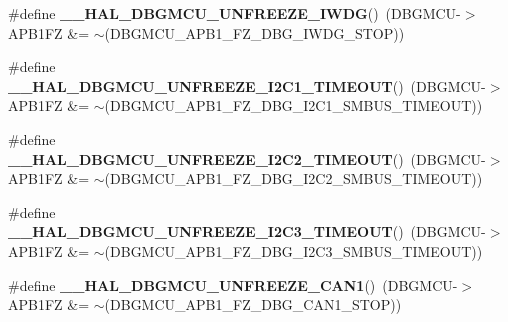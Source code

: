 \begin{DoxyCompactItemize}
\item 
\mbox{\label{group___h_a_l___exported___macros_gab29a88ef9c31cbe107c58b9ecc3bdf79}} 
\#define {\bfseries \+\_\+\+\_\+\+H\+A\+L\+\_\+\+D\+B\+G\+M\+C\+U\+\_\+\+U\+N\+F\+R\+E\+E\+Z\+E\+\_\+\+I\+W\+DG}()~(D\+B\+G\+M\+CU-\/$>$A\+P\+B1\+FZ \&= $\sim$(D\+B\+G\+M\+C\+U\+\_\+\+A\+P\+B1\+\_\+\+F\+Z\+\_\+\+D\+B\+G\+\_\+\+I\+W\+D\+G\+\_\+\+S\+T\+OP))
\item 
\mbox{\label{group___h_a_l___exported___macros_ga636083d6b6931b1cf35e7c39aebf0723}} 
\#define {\bfseries \+\_\+\+\_\+\+H\+A\+L\+\_\+\+D\+B\+G\+M\+C\+U\+\_\+\+U\+N\+F\+R\+E\+E\+Z\+E\+\_\+\+I2\+C1\+\_\+\+T\+I\+M\+E\+O\+UT}()~(D\+B\+G\+M\+CU-\/$>$A\+P\+B1\+FZ \&= $\sim$(D\+B\+G\+M\+C\+U\+\_\+\+A\+P\+B1\+\_\+\+F\+Z\+\_\+\+D\+B\+G\+\_\+\+I2\+C1\+\_\+\+S\+M\+B\+U\+S\+\_\+\+T\+I\+M\+E\+O\+UT))
\item 
\mbox{\label{group___h_a_l___exported___macros_ga0308bdec86c19b7bbe236c4724d7d536}} 
\#define {\bfseries \+\_\+\+\_\+\+H\+A\+L\+\_\+\+D\+B\+G\+M\+C\+U\+\_\+\+U\+N\+F\+R\+E\+E\+Z\+E\+\_\+\+I2\+C2\+\_\+\+T\+I\+M\+E\+O\+UT}()~(D\+B\+G\+M\+CU-\/$>$A\+P\+B1\+FZ \&= $\sim$(D\+B\+G\+M\+C\+U\+\_\+\+A\+P\+B1\+\_\+\+F\+Z\+\_\+\+D\+B\+G\+\_\+\+I2\+C2\+\_\+\+S\+M\+B\+U\+S\+\_\+\+T\+I\+M\+E\+O\+UT))
\item 
\mbox{\label{group___h_a_l___exported___macros_ga8beda05b7dc4962557f98a06e29326a4}} 
\#define {\bfseries \+\_\+\+\_\+\+H\+A\+L\+\_\+\+D\+B\+G\+M\+C\+U\+\_\+\+U\+N\+F\+R\+E\+E\+Z\+E\+\_\+\+I2\+C3\+\_\+\+T\+I\+M\+E\+O\+UT}()~(D\+B\+G\+M\+CU-\/$>$A\+P\+B1\+FZ \&= $\sim$(D\+B\+G\+M\+C\+U\+\_\+\+A\+P\+B1\+\_\+\+F\+Z\+\_\+\+D\+B\+G\+\_\+\+I2\+C3\+\_\+\+S\+M\+B\+U\+S\+\_\+\+T\+I\+M\+E\+O\+UT))
\item 
\mbox{\label{group___h_a_l___exported___macros_gad580d0ec1c7b8eb8d5935e1fcbd58b07}} 
\#define {\bfseries \+\_\+\+\_\+\+H\+A\+L\+\_\+\+D\+B\+G\+M\+C\+U\+\_\+\+U\+N\+F\+R\+E\+E\+Z\+E\+\_\+\+C\+A\+N1}()~(D\+B\+G\+M\+CU-\/$>$A\+P\+B1\+FZ \&= $\sim$(D\+B\+G\+M\+C\+U\+\_\+\+A\+P\+B1\+\_\+\+F\+Z\+\_\+\+D\+B\+G\+\_\+\+C\+A\+N1\+\_\+\+S\+T\+OP))
\item 
\mbox{\label{group___h_a_l___exported___macros_ga10fd523f4709571f091465b8d58ad385}} 

\end{DoxyCompactItemize}
